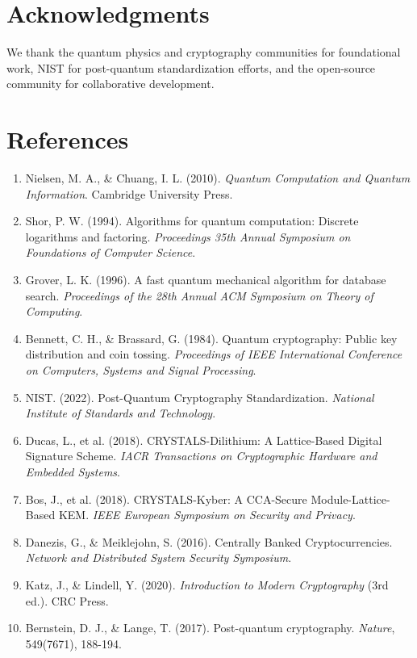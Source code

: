 \documentclass[11pt,a4paper]{article}
\begin{document}
\section*{Acknowledgments}

We thank the quantum physics and cryptography communities for foundational work, NIST for post-quantum standardization efforts, and the open-source community for collaborative development.

\section*{References}

\begin{enumerate}
    \item Nielsen, M. A., \& Chuang, I. L. (2010). \textit{Quantum Computation and Quantum Information}. Cambridge University Press.
    
    \item Shor, P. W. (1994). Algorithms for quantum computation: Discrete logarithms and factoring. \textit{Proceedings 35th Annual Symposium on Foundations of Computer Science}.
    
    \item Grover, L. K. (1996). A fast quantum mechanical algorithm for database search. \textit{Proceedings of the 28th Annual ACM Symposium on Theory of Computing}.
    
    \item Bennett, C. H., \& Brassard, G. (1984). Quantum cryptography: Public key distribution and coin tossing. \textit{Proceedings of IEEE International Conference on Computers, Systems and Signal Processing}.
    
    \item NIST. (2022). Post-Quantum Cryptography Standardization. \textit{National Institute of Standards and Technology}.
    
    \item Ducas, L., et al. (2018). CRYSTALS-Dilithium: A Lattice-Based Digital Signature Scheme. \textit{IACR Transactions on Cryptographic Hardware and Embedded Systems}.
    
    \item Bos, J., et al. (2018). CRYSTALS-Kyber: A CCA-Secure Module-Lattice-Based KEM. \textit{IEEE European Symposium on Security and Privacy}.
    
    \item Danezis, G., \& Meiklejohn, S. (2016). Centrally Banked Cryptocurrencies. \textit{Network and Distributed System Security Symposium}.
    
    \item Katz, J., \& Lindell, Y. (2020). \textit{Introduction to Modern Cryptography} (3rd ed.). CRC Press.
    
    \item Bernstein, D. J., \& Lange, T. (2017). Post-quantum cryptography. \textit{Nature}, 549(7671), 188-194.
\end{enumerate}
\end{document}
